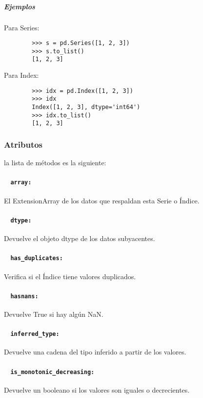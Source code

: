 \subparagraph{Ejemplos}
Para Series:
\begin{verbatim}
        >>> s = pd.Series([1, 2, 3])
        >>> s.to_list()
        [1, 2, 3]
        \end{verbatim}
Para Index:
\begin{verbatim}
        >>> idx = pd.Index([1, 2, 3])
        >>> idx
        Index([1, 2, 3], dtype='int64')
        >>> idx.to_list()
        [1, 2, 3]
        \end{verbatim}

\subsubsection{Atributos}

la lista de métodos es la siguiente:

\paragraph{~\hspace{2em} \texttt{array:}} El ExtensionArray de los datos que
respaldan esta Serie o Índice.
\paragraph{~\hspace{2em} \texttt{dtype:}} Devuelve el objeto dtype de los datos
subyacentes.
\paragraph{~\hspace{2em} \texttt{has\_duplicates:}} Verifica si el Índice tiene
valores duplicados.
\paragraph{~\hspace{2em} \texttt{hasnans:}} Devuelve True si hay algún NaN.
\paragraph{~\hspace{2em} \texttt{inferred\_type:}} Devuelve una cadena del tipo
inferido a partir de los valores.
\paragraph{~\hspace{2em} \texttt{is\_monotonic\_decreasing:}} Devuelve un
booleano si los valores son iguales o decrecientes.
